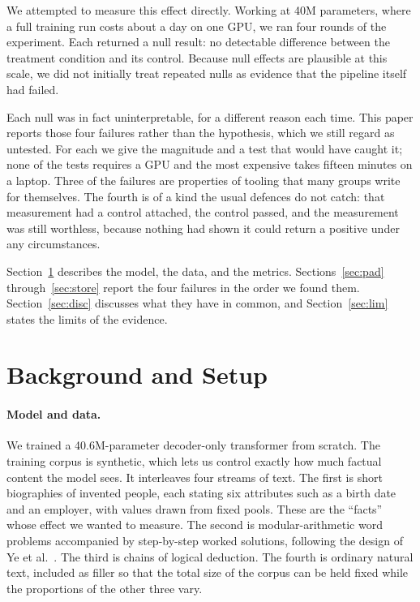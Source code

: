 \documentclass[10pt,twocolumn]{article}
\begin{document}
We attempted to measure this effect directly. Working at 40M parameters, where
a full training run costs about a day on one GPU, we ran four rounds of the
experiment. Each returned a null result: no detectable difference between the
treatment condition and its control. Because null effects are plausible at this
scale, we did not initially treat repeated nulls as evidence that the pipeline
itself had failed.

Each null was in fact uninterpretable, for a different reason each time. This
paper reports those four failures rather than the hypothesis, which we still
regard as untested. For each we give the magnitude and a test that would have
caught it; none of the tests requires a GPU and the most expensive takes fifteen
minutes on a laptop. Three of the failures are properties of tooling that many
groups write for themselves. The fourth is of a kind the usual defences do not
catch: that measurement had a control attached, the control passed, and the
measurement was still worthless, because nothing had shown it could return a
positive under any circumstances.

Section~\ref{sec:bg} describes the model, the data, and the metrics.
Sections~\ref{sec:pad} through~\ref{sec:store} report the four failures in the
order we found them. Section~\ref{sec:disc} discusses what they have in common,
and Section~\ref{sec:lim} states the limits of the evidence.

\section{Background and Setup}
\label{sec:bg}

\paragraph{Model and data.}
We trained a 40.6M-parameter decoder-only transformer from scratch. The
training corpus is synthetic, which lets us control exactly how much factual
content the model sees. It interleaves four streams of text. The first is short
biographies of invented people, each stating six attributes such as a birth
date and an employer, with values drawn from fixed pools. These are the
``facts'' whose effect we wanted to measure. The second is modular-arithmetic
word problems accompanied by step-by-step worked solutions, following the
design of Ye et al.~\cite{igsm}. The third is chains of logical deduction. The
fourth is ordinary natural text, included as filler so that the total size of
the corpus can be held fixed while the proportions of the other three vary.
\end{document}
